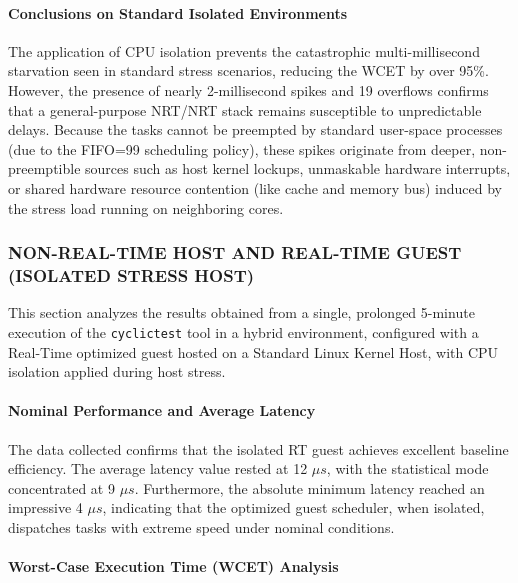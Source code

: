 \paragraph{Conclusions on Standard Isolated
Environments}\label{conclusions-on-standard-isolated-environments}

The application of CPU isolation prevents the catastrophic
multi-millisecond starvation seen in standard stress scenarios, reducing
the WCET by over 95\%. However, the presence of nearly 2-millisecond
spikes and 19 overflows confirms that a general-purpose NRT/NRT stack
remains susceptible to unpredictable delays. Because the tasks cannot be
preempted by standard user-space processes (due to the FIFO=99
scheduling policy), these spikes originate from deeper, non-preemptible
sources such as host kernel lockups, unmaskable hardware interrupts, or
shared hardware resource contention (like cache and memory bus) induced
by the stress load running on neighboring cores.

\subsubsection{NON-REAL-TIME HOST AND REAL-TIME GUEST (ISOLATED STRESS
HOST)}\label{non-real-time-host-and-real-time-guest-isolated-stress-host}

This section analyzes the results obtained from a single, prolonged
5-minute execution of the \texttt{cyclictest} tool in a hybrid
environment, configured with a Real-Time optimized guest hosted on a
Standard Linux Kernel Host, with CPU isolation applied during host
stress.

\paragraph{Nominal Performance and Average
Latency}\label{nominal-performance-and-average-latency-5}

The data collected confirms that the isolated RT guest achieves
excellent baseline efficiency. The average latency value rested at 12
$\mu s$, with the statistical mode concentrated at 9 $\mu s$. Furthermore, the
absolute minimum latency reached an impressive 4 $\mu s$, indicating that the
optimized guest scheduler, when isolated, dispatches tasks with extreme
speed under nominal conditions.

\paragraph{Worst-Case Execution Time (WCET)
Analysis}\label{worst-case-execution-time-wcet-analysis-6}

